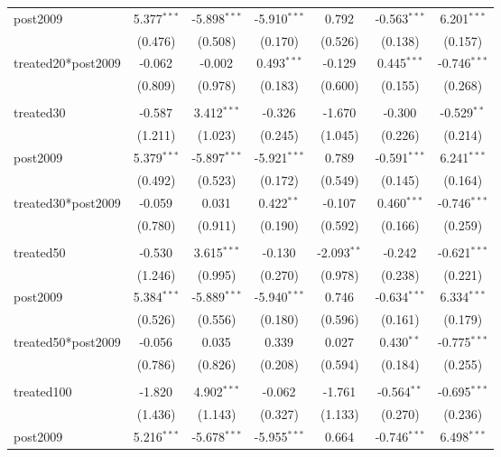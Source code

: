 \documentclass[12pt]{article}
\begin{document}
\begin{table}[!htbp]
\begin{tabular}{@{\extracolsep{5pt}}lcccccc}
 post2009 & 5.377$^{***}$ & -5.898$^{***}$ & -5.910$^{***}$ & 0.792$^{}$ & -0.563$^{***}$ & 6.201$^{***}$ \\
  & (0.476) & (0.508) & (0.170) & (0.526) & (0.138) & (0.157) \\
 treated20*post2009 & -0.062$^{}$ & -0.002$^{}$ & 0.493$^{***}$ & -0.129$^{}$ & 0.445$^{***}$ & -0.746$^{***}$ \\
  & (0.809) & (0.978) & (0.183) & (0.600) & (0.155) & (0.268) \\
\hline \\[-1.8ex]
 treated30 & -0.587$^{}$ & 3.412$^{***}$ & -0.326$^{}$ & -1.670$^{}$ & -0.300$^{}$ & -0.529$^{**}$ \\
  & (1.211) & (1.023) & (0.245) & (1.045) & (0.226) & (0.214) \\
 post2009 & 5.379$^{***}$ & -5.897$^{***}$ & -5.921$^{***}$ & 0.789$^{}$ & -0.591$^{***}$ & 6.241$^{***}$ \\
  & (0.492) & (0.523) & (0.172) & (0.549) & (0.145) & (0.164) \\
 treated30*post2009 & -0.059$^{}$ & 0.031$^{}$ & 0.422$^{**}$ & -0.107$^{}$ & 0.460$^{***}$ & -0.746$^{***}$ \\
  & (0.780) & (0.911) & (0.190) & (0.592) & (0.166) & (0.259) \\
\hline \\[-1.8ex]
 treated50 & -0.530$^{}$ & 3.615$^{***}$ & -0.130$^{}$ & -2.093$^{**}$ & -0.242$^{}$ & -0.621$^{***}$ \\
  & (1.246) & (0.995) & (0.270) & (0.978) & (0.238) & (0.221) \\
 post2009 & 5.384$^{***}$ & -5.889$^{***}$ & -5.940$^{***}$ & 0.746$^{}$ & -0.634$^{***}$ & 6.334$^{***}$ \\
  & (0.526) & (0.556) & (0.180) & (0.596) & (0.161) & (0.179) \\
 treated50*post2009 & -0.056$^{}$ & 0.035$^{}$ & 0.339$^{}$ & 0.027$^{}$ & 0.430$^{**}$ & -0.775$^{***}$ \\
  & (0.786) & (0.826) & (0.208) & (0.594) & (0.184) & (0.255) \\
\hline \\[-1.8ex]
 treated100 & -1.820$^{}$ & 4.902$^{***}$ & -0.062$^{}$ & -1.761$^{}$ & -0.564$^{**}$ & -0.695$^{***}$ \\
  & (1.436) & (1.143) & (0.327) & (1.133) & (0.270) & (0.236) \\
 post2009 & 5.216$^{***}$ & -5.678$^{***}$ & -5.955$^{***}$ & 0.664$^{}$ & -0.746$^{***}$ & 6.498$^{***}$ \\

\end{tabular}
\end{table}
\end{document}

